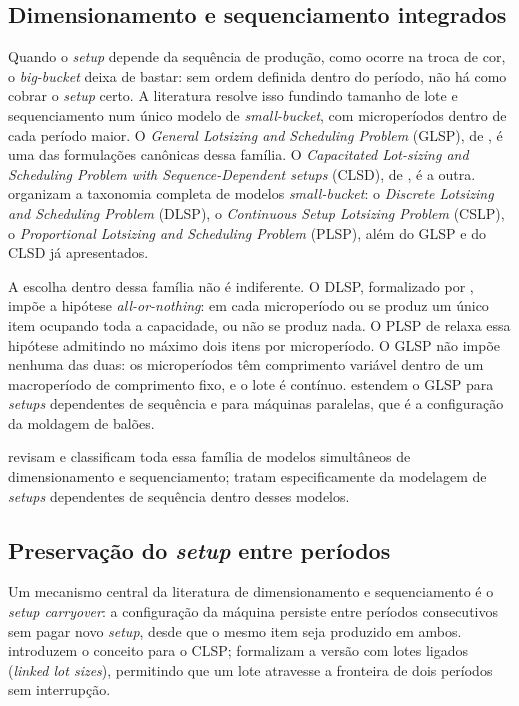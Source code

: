 \documentclass[
    12pt,
    openright,
    oneside,
    a4paper,
    fleqn,
    chapter=TITLE,
    section=TITLE,
    english,
    brazil
]{abntex2}
\begin{document}
\subsection{Dimensionamento e sequenciamento integrados}

Quando o \textit{setup} depende da sequência de produção, como ocorre na troca de cor, o \textit{big-bucket} deixa de bastar: sem ordem definida dentro do período, não há como cobrar o \textit{setup} certo. A literatura resolve isso fundindo tamanho de lote e sequenciamento num único modelo de \textit{small-bucket}, com microperíodos dentro de cada período maior. O \textit{General Lotsizing and Scheduling Problem} (GLSP), de , é uma das formulações canônicas dessa família. O \textit{Capacitated Lot-sizing and Scheduling Problem with Sequence-Dependent setups} (CLSD), de , é a outra.  organizam a taxonomia completa de modelos \textit{small-bucket}: o \textit{Discrete Lotsizing and Scheduling Problem} (DLSP), o \textit{Continuous Setup Lotsizing Problem} (CSLP), o \textit{Proportional Lotsizing and Scheduling Problem} (PLSP), além do GLSP e do CLSD já apresentados.

A escolha dentro dessa família não é indiferente. O DLSP, formalizado por , impõe a hipótese \textit{all-or-nothing}: em cada microperíodo ou se produz um único item ocupando toda a capacidade, ou não se produz nada. O PLSP de  relaxa essa hipótese admitindo no máximo dois itens por microperíodo. O GLSP não impõe nenhuma das duas: os microperíodos têm comprimento variável dentro de um macroperíodo de comprimento fixo, e o lote é contínuo.  estendem o GLSP para \textit{setups} dependentes de sequência e para máquinas paralelas, que é a configuração da moldagem de balões.

 revisam e classificam toda essa família de modelos simultâneos de dimensionamento e sequenciamento;  tratam especificamente da modelagem de \textit{setups} dependentes de sequência dentro desses modelos.

\subsection{Preservação do \textit{setup} entre períodos}
\label{sec:preservacao_setup}

Um mecanismo central da literatura de dimensionamento e sequenciamento é o \textit{setup carryover}: a configuração da máquina persiste entre períodos consecutivos sem pagar novo \textit{setup}, desde que o mesmo item seja produzido em ambos.  introduzem o conceito para o CLSP;  formalizam a versão com lotes ligados (\textit{linked lot sizes}), permitindo que um lote atravesse a fronteira de dois períodos sem interrupção.
\end{document}
